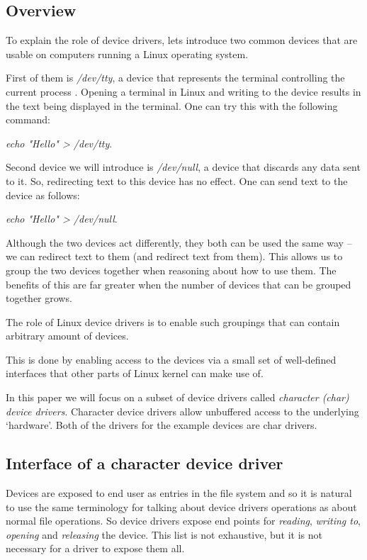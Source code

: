 \documentclass[..thesis.tex]{subfiles}
\begin{document}
\subsection{Overview}


To explain the role of device drivers, lets introduce two common devices that are usable on computers running a Linux operating system.

First of them is \textit{/dev/tty}, a device that represents the terminal controlling the current process \cite{torvalds_linux}. Opening a terminal in Linux and writing to the device results in the text being displayed in the terminal. One can try this with the following command: 

\textit{echo "Hello" > /dev/tty}.
 
Second device we will introduce is \textit{/dev/null}, a device that discards any data sent to it. So, redirecting text to this device has no effect.
One can send text to the device as follows:

\textit{echo "Hello" > /dev/null}.

Although the two devices act differently, they both can be used the same way -- we can redirect text to them (and redirect text from them). This allows us to group the two devices together when reasoning about how to use them. The benefits of this are far greater when the number of devices that can be grouped together grows.

The role of Linux device drivers is to enable such groupings that can contain arbitrary amount of devices.

This is done by enabling access to the devices via a small set of well-defined interfaces that other parts of Linux kernel can make use of. 

In this paper we will focus on a subset of device drivers called \textit{character (char) device drivers}. Character device drivers allow unbuffered access to the underlying `hardware'. Both of the drivers for the example devices are char drivers.

\subsection{Interface of a character device driver}

Devices are exposed to end user as entries in the file system and so it is natural to use the same terminology for talking about device drivers operations as about normal file operations. So device drivers expose end points for \textit{reading}, \textit{writing to}, \textit{opening} and \textit{releasing} the device. This list is not exhaustive\cite[include/linux/fs.h]{torvalds_linux}, but it is not necessary for a driver to expose them all.
\end{document}
